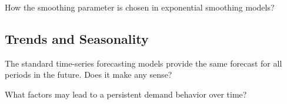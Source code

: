 \begin{exercise}
How the smoothing parameter is chosen in exponential smoothing models?

\end{exercise}


\subsection{Trends and Seasonality}

\begin{exercise}
The standard time-series forecasting models provide the same forecast for all periods in the future. Does it make any sense? 

\end{exercise}

\begin{exercise}
What factors may lead to a persistent demand behavior over time?

\end{exercise}

